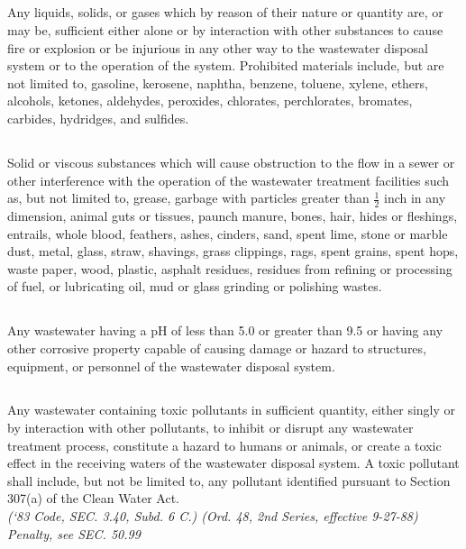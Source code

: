 \subsection{}
Any liquids, solids, or gases which by reason of their nature or quantity are, or may be, sufficient either alone or by interaction with other substances to cause fire or explosion or be injurious in any other way to the wastewater disposal system or to the operation of the system.  Prohibited materials include, but are not limited to, gasoline, kerosene, naphtha, benzene, toluene, xylene, ethers, alcohols, ketones, aldehydes, peroxides, chlorates, perchlorates, bromates, carbides, hydridges, and sulfides.
\subsection{}
Solid or viscous substances which will cause obstruction to the flow in a sewer or other interference with the operation of the wastewater treatment facilities such as, but not limited to, grease, garbage with particles greater than $\frac{1}{2}$ inch in any dimension, animal guts or tissues, paunch manure, bones, hair, hides or fleshings, entrails, whole blood, feathers, ashes, cinders, sand, spent lime, stone or marble dust, metal, glass, straw, shavings, grass clippings, rags, spent grains, spent hops, waste paper, wood, plastic, asphalt residues, residues from refining or processing of fuel, or lubricating oil, mud or glass grinding or polishing wastes.
\subsection{}
Any wastewater having a pH of less than 5.0 or greater than 9.5 or having any other corrosive property capable of causing damage or hazard to structures, equipment, or personnel of the wastewater disposal system.
\subsection{}
Any wastewater containing toxic pollutants in sufficient quantity, either singly or by interaction with other pollutants, to inhibit or disrupt any wastewater treatment process, constitute a hazard to humans or animals, or create a toxic effect in the receiving waters of the wastewater disposal system.  A toxic pollutant shall include, but not be limited to, any pollutant identified pursuant to Section 307(a) of the Clean Water Act.\\
\emph{(‘83 Code, SEC. 3.40, Subd. 6 C.) (Ord. 48, 2nd Series, effective 9-27-88)}\\
\emph{Penalty, see SEC. 50.99}
